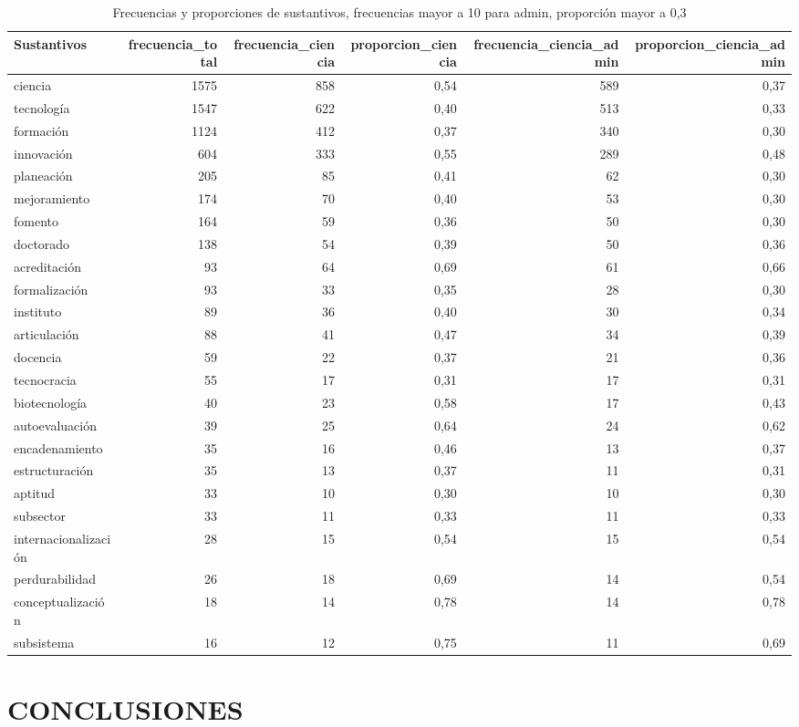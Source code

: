 \documentclass[11pt,                                                            
 superscriptaddress,twoside,
 amsmath,amssymb,
 aps, physrev
]{revtex4-2}
\begin{document}
\begin{table}[ht]
	\centering
	\begin{tabular}{lrrrrr}
		\hline
		Sustantivos & frecuencia\_total & frecuencia\_ciencia & proporcion\_ciencia & frecuencia\_ciencia\_admin & proporcion\_ciencia\_admin \\
		\hline
		ciencia                & 1575 & 858 & 0,54 & 589 & 0,37 \\
		tecnología             & 1547 & 622 & 0,40 & 513 & 0,33 \\
		formación              & 1124 & 412 & 0,37 & 340 & 0,30 \\
		innovación             & 604  & 333 & 0,55 & 289 & 0,48 \\
		planeación             & 205  & 85  & 0,41 & 62  & 0,30 \\
		mejoramiento           & 174  & 70  & 0,40 & 53  & 0,30 \\
		fomento                & 164  & 59  & 0,36 & 50  & 0,30 \\
		doctorado              & 138  & 54  & 0,39 & 50  & 0,36 \\
		acreditación           & 93   & 64  & 0,69 & 61  & 0,66 \\
		formalización          & 93   & 33  & 0,35 & 28  & 0,30 \\
		instituto              & 89   & 36  & 0,40 & 30  & 0,34 \\
		articulación           & 88   & 41  & 0,47 & 34  & 0,39 \\
		docencia               & 59   & 22  & 0,37 & 21  & 0,36 \\
		tecnocracia            & 55   & 17  & 0,31 & 17  & 0,31 \\
		biotecnología          & 40   & 23  & 0,58 & 17  & 0,43 \\
		autoevaluación         & 39   & 25  & 0,64 & 24  & 0,62 \\
		encadenamiento         & 35   & 16  & 0,46 & 13  & 0,37 \\
		estructuración         & 35   & 13  & 0,37 & 11  & 0,31 \\
		aptitud                & 33   & 10  & 0,30 & 10  & 0,30 \\
		subsector              & 33   & 11  & 0,33 & 11  & 0,33 \\
		internacionalización   & 28   & 15  & 0,54 & 15  & 0,54 \\
		perdurabilidad         & 26   & 18  & 0,69 & 14  & 0,54 \\
		conceptualización      & 18   & 14  & 0,78 & 14  & 0,78 \\
		subsistema             & 16   & 12  & 0,75 & 11  & 0,69 \\
		\hline
	\end{tabular}
	\caption{Frecuencias y proporciones de sustantivos, frecuencias mayor a 10 para admin, proporción mayor a 0,3}
\end{table}


\clearpage






\section{CONCLUSIONES}


\end{document}

